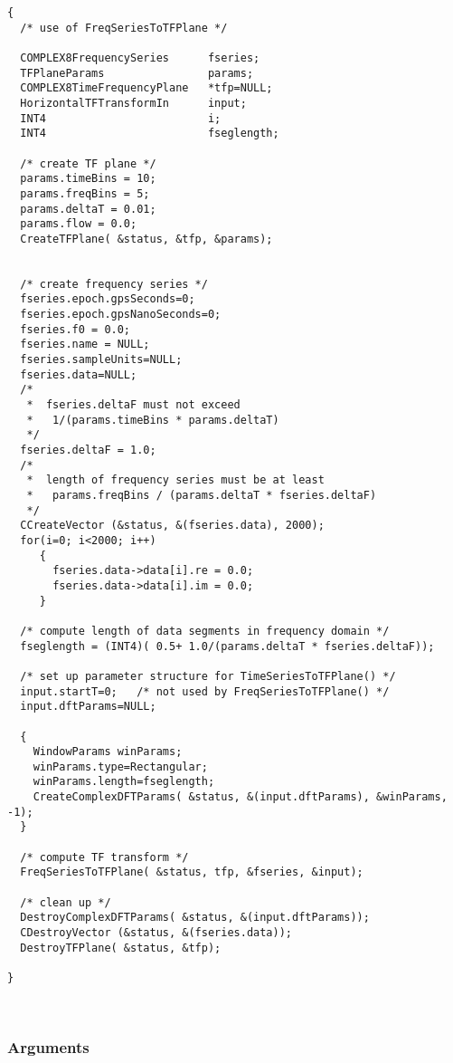 \documentclass{article}
\begin{document}
\begin{verbatim}
{
  /* use of FreqSeriesToTFPlane */

  COMPLEX8FrequencySeries      fseries;
  TFPlaneParams                params;
  COMPLEX8TimeFrequencyPlane   *tfp=NULL;
  HorizontalTFTransformIn      input;
  INT4                         i;
  INT4                         fseglength;

  /* create TF plane */
  params.timeBins = 10;
  params.freqBins = 5;  
  params.deltaT = 0.01;
  params.flow = 0.0;
  CreateTFPlane( &status, &tfp, &params);


  /* create frequency series */
  fseries.epoch.gpsSeconds=0;
  fseries.epoch.gpsNanoSeconds=0;
  fseries.f0 = 0.0;
  fseries.name = NULL;
  fseries.sampleUnits=NULL;
  fseries.data=NULL;
  /*
   *  fseries.deltaF must not exceed 
   *   1/(params.timeBins * params.deltaT)
   */
  fseries.deltaF = 1.0; 
  /*
   *  length of frequency series must be at least
   *   params.freqBins / (params.deltaT * fseries.deltaF)
   */
  CCreateVector (&status, &(fseries.data), 2000);
  for(i=0; i<2000; i++)
     {
       fseries.data->data[i].re = 0.0;
       fseries.data->data[i].im = 0.0;
     }
       
  /* compute length of data segments in frequency domain */  
  fseglength = (INT4)( 0.5+ 1.0/(params.deltaT * fseries.deltaF));  

  /* set up parameter structure for TimeSeriesToTFPlane() */
  input.startT=0;   /* not used by FreqSeriesToTFPlane() */
  input.dftParams=NULL;

  {
    WindowParams winParams;
    winParams.type=Rectangular;
    winParams.length=fseglength;
    CreateComplexDFTParams( &status, &(input.dftParams), &winParams, -1); 
  }

  /* compute TF transform */
  FreqSeriesToTFPlane( &status, tfp, &fseries, &input);

  /* clean up */
  DestroyComplexDFTParams( &status, &(input.dftParams));
  CDestroyVector (&status, &(fseries.data));
  DestroyTFPlane( &status, &tfp);
  
}



\end{verbatim}

\subsubsection{Arguments}

\end{document}
